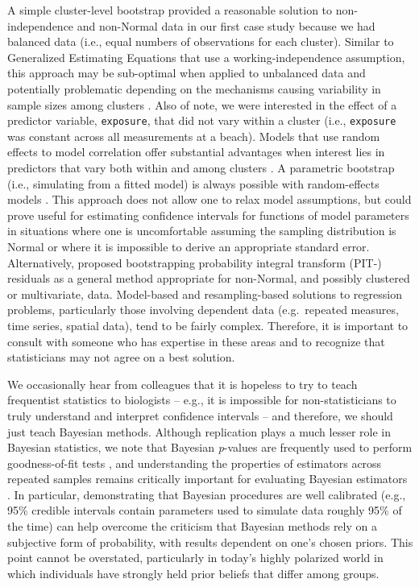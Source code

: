 \documentclass[fleqn,10pt]{wlpeerj} %
\begin{document}
A simple cluster-level bootstrap provided a reasonable solution to non-independence and non-Normal data in our first case study because we had balanced data (i.e., equal numbers of observations for each cluster). Similar to Generalized Estimating Equations that use a working-independence assumption, this approach may be sub-optimal when applied to unbalanced data and potentially problematic depending on the mechanisms causing variability in sample sizes among clusters \citep[e.g., if the size of the cluster is in some way related to the response of interest;][]{williamson2014informative}. Also of note, we were interested in the effect of a predictor variable, \texttt{exposure}, that did not vary within a cluster (i.e., \texttt{exposure} was constant across all measurements at a beach). Models that use random effects to model correlation offer substantial advantages when interest lies in predictors that vary both within and among clusters \citep{muff2016marginal}. A parametric bootstrap (i.e., simulating from a fitted model) is always possible with random-effects models \citep[e.g., using the \texttt{bootMer} function in the \texttt{lme4} package;][]{lme4}. This approach does not allow one to relax model assumptions, but could prove useful for estimating confidence intervals for functions of model parameters in situations where one is uncomfortable assuming the sampling distribution is Normal or where it is impossible to derive an appropriate standard error. Alternatively, \citet{warton2017pit} proposed bootstrapping probability integral transform (PIT-) residuals as a general method appropriate for non-Normal, and possibly clustered or multivariate, data. Model-based and resampling-based solutions to regression problems, particularly those involving dependent data (e.g.~repeated measures, time series, spatial data), tend to be fairly complex. Therefore, it is important to consult with someone who has expertise in these areas and to recognize that statisticians may not agree on a best solution.

We occasionally hear from colleagues that it is hopeless to try to teach frequentist statistics to biologists -- e.g., it is impossible for non-statisticians to truly understand and interpret confidence intervals -- and therefore, we should just teach Bayesian methods. Although replication plays a much lesser role in Bayesian statistics, we note that Bayesian \emph{p}-values are frequently used to perform goodness-of-fit tests \citep{marc_2010}, and understanding the properties of estimators across repeated samples remains critically important for evaluating Bayesian estimators \citep{rubin1984bayesianly, Little2006}. In particular, demonstrating that Bayesian procedures are well calibrated (e.g., 95\% credible intervals contain parameters used to simulate data roughly 95\% of the time) can help overcome the criticism that Bayesian methods rely on a subjective form of probability, with results dependent on one's chosen priors. This point cannot be overstated, particularly in today's highly polarized world in which individuals have strongly held prior beliefs that differ among groups.
\end{document}
